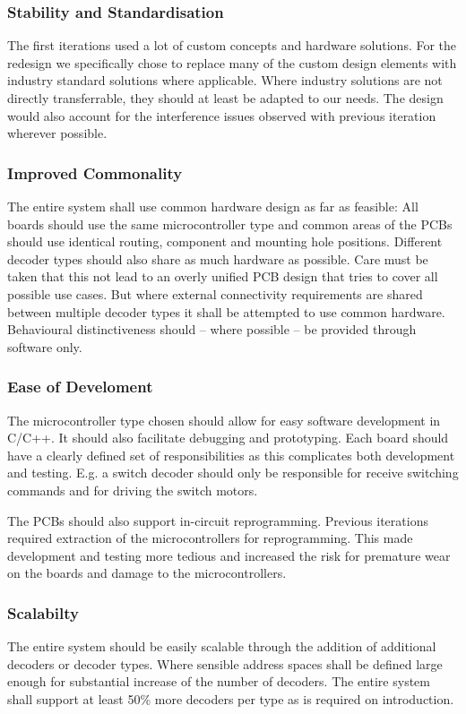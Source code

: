 \documentclass{scrreprt}
\begin{document}
\subsubsection{Stability and Standardisation}
The first iterations used a lot of custom concepts and hardware solutions.
For the redesign we specifically chose to replace many of the custom design elements with industry standard solutions where applicable.
Where industry solutions are not directly transferrable, they should at least be adapted to our needs.
The design would also account for the interference issues observed with previous iteration wherever possible.

\subsubsection{Improved Commonality}
The entire system shall use common hardware design as far as feasible:
All boards should use the same microcontroller type and common areas of the PCBs should use identical routing, component and mounting hole positions.
Different decoder types should also share as much hardware as possible.
Care must be taken that this not lead to an overly unified PCB design that tries to cover all possible use cases.
But where external connectivity requirements are shared between multiple decoder types it shall be attempted to use common hardware.
Behavioural distinctiveness should -- where possible -- be provided through software only.

\subsubsection{Ease of Develoment}
The microcontroller type chosen should allow for easy software development in C/C++.
It should also facilitate debugging and prototyping.
Each board should have a clearly defined set of responsibilities as this complicates both development and testing.
E.g. a switch decoder should only be responsible for receive switching commands and for driving the switch motors.

The PCBs should also support in-circuit reprogramming.
Previous iterations required extraction of the microcontrollers for reprogramming.
This made development and testing more tedious and increased the risk for premature wear on the boards and damage to the microcontrollers.

\subsubsection{Scalabilty}
The entire system should be easily scalable through the addition of additional decoders or decoder types.
Where sensible address spaces shall be defined large enough for substantial increase of the number of decoders.
The entire system shall support at least 50\% more decoders per type as is required on introduction.
\end{document}
